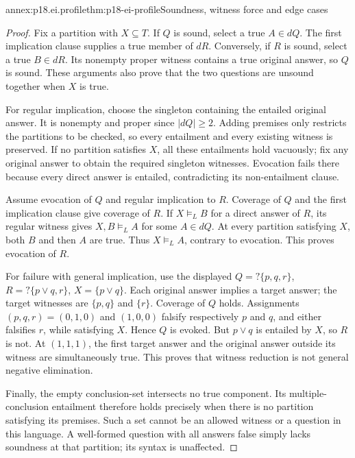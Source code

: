 \begin{annexitem}{annex:p18.ei.profile}{thm:p18-ei-profile}{Soundness, witness force and edge cases}
\begin{proof}
Fix a partition with \(X\subseteq T\). If \(Q\) is sound, select a true
\(A\in dQ\). The first implication clause supplies a true member of
\(dR\). Conversely, if \(R\) is sound, select a true \(B\in dR\).
Its nonempty proper witness contains a true original answer, so \(Q\) is
sound. These arguments also prove that the two questions are unsound together
when \(X\) is true.

For regular implication, choose the singleton containing the entailed
original answer. It is nonempty and proper since \(|dQ|\geq2\). Adding
premises only restricts the partitions to be checked, so every entailment and
every existing witness is preserved. If no partition satisfies \(X\), all
these entailments hold vacuously; fix any original answer to obtain the required
singleton witnesses. Evocation fails there because every direct answer is
entailed, contradicting its non-entailment clause.

Assume evocation of \(Q\) and regular implication to \(R\). Coverage of
\(Q\) and the first implication clause give coverage of \(R\). If
\(X\models_L B\) for a direct answer of \(R\), its regular witness gives
\(X,B\models_L A\) for some \(A\in dQ\). At every partition satisfying
\(X\), both \(B\) and then \(A\) are true. Thus \(X\models_L A\),
contrary to evocation. This proves evocation of \(R\).

For failure with general implication, use the displayed
\(Q=?\{p,q,r\}\), \(R=?\{p\lor q,r\}\), \(X=\{p\lor q\}\).
Each original answer implies a target answer; the target witnesses are
\(\{p,q\}\) and \(\{r\}\). Coverage of \(Q\) holds. Assignments
\((p,q,r)=(0,1,0)\) and \((1,0,0)\) falsify respectively \(p\) and
\(q\), and either falsifies \(r\), while satisfying \(X\). Hence \(Q\)
is evoked. But \(p\lor q\) is entailed by \(X\), so \(R\) is not.
At \((1,1,1)\), the first target answer and the original answer outside its
witness are simultaneously true. This proves that witness reduction is not
general negative elimination.

Finally, the empty conclusion-set intersects no true component. Its
multiple-conclusion entailment therefore holds precisely when there is no
partition satisfying its premises. Such a set cannot be an allowed witness
or a question in this language. A well-formed question with all answers
false simply lacks soundness at that partition; its syntax is unaffected.
\end{proof}
\end{annexitem}

